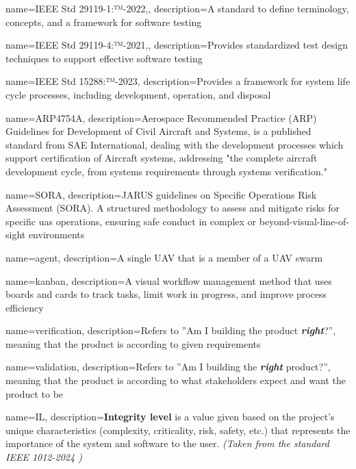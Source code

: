 {
        name=IEEE Std 29119-1:™-2022,,
        description={A standard to define terminology, concepts, and a framework for software testing}
}

{
        name=IEEE Std 29119-4:™-2021,,
        description={Provides standardized test design techniques to support effective software testing}
}

{
        name=IEEE Std 15288:™-2023,
        description={Provides a framework for system life cycle processes, including development, operation, and disposal}
}

{
        name=ARP4754A,
        description={Aerospace Recommended Practice (ARP) Guidelines for Development of Civil Aircraft and Systems, is a published standard from SAE International, dealing with the development processes which support certification of Aircraft systems, addressing "the complete aircraft development cycle, from systems requirements through systems verification."}
}

{
        name=SORA,
        description={JARUS guidelines on Specific Operations Risk Assessment (SORA). A structured methodology to assess and mitigate risks for specific \acrshort{uas} operations, ensuring safe conduct in complex or beyond-visual-line-of-sight environments}
}


{
        name=agent,
        description={A single UAV that is a member of a UAV swarm}
}

{
        name=kanban,
        description={A visual workflow management method that uses boards and cards to track tasks, limit work in progress, and improve process efficiency}
}

{
        name=verification,
        description={Refers to ''Am I building the product \textbf{\textit{right}}?'', meaning that the product is according to given requirements}
}

{
        name=validation,
        description={Refers to ''Am I building the \textbf{\textit{right}} product?'', meaning that the product is according to what stakeholders expect and want the product to be}
}

{
		name=IL,
		description={\textbf{Integrity level} is a value given based on the project's unique characteristics (complexity, criticality, risk, safety, etc.) that represents the importance of the system and software to the user. \textit{(Taken from the standard IEEE 1012-2024 \cite{1012-2024})}}
}

